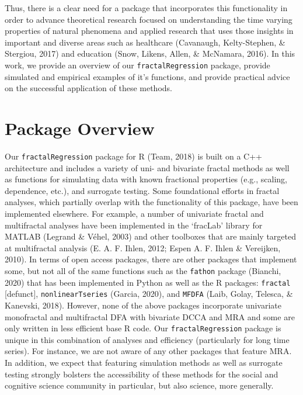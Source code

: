 \documentclass[
  man]{apa6}
\begin{document}
Thus, there is a clear need for a package that incorporates this
functionality in order to advance theoretical research focused on
understanding the time varying properties of natural phenomena and
applied research that uses those insights in important and diverse areas
such as healthcare (Cavanaugh, Kelty-Stephen, \& Stergiou, 2017) and education (Snow, Likens, Allen, \& McNamara, 2016). In this
work, we provide an overview of our \texttt{fractalRegression} package, provide
simulated and empirical examples of it's functions, and provide
practical advice on the successful application of these methods.

\hypertarget{package-overview}{%
\section{Package Overview}\label{package-overview}}

Our \texttt{fractalRegression} package for R
(Team, 2018) is built on a C++
architecture and includes a variety of uni- and bivariate fractal
methods as well as functions for simulating data with known fractional
properties (e.g., scaling, dependence, etc.), and surrogate testing.
Some foundational efforts in fractal analyses, which partially overlap
with the functionality of this package, have been implemented elsewhere.
For example, a number of univariate fractal and multifractal analyses
have been implemented in the `fracLab' library for MATLAB (Legrand \& Véhel, 2003)
and other toolboxes that are mainly targeted at multifractal analysis
(E. A. F. Ihlen, 2012; Espen A. F. Ihlen \& Vereijken, 2010). In terms of
open access packages, there are other packages that implement some, but
not all of the same functions such as the \texttt{fathon} package
(Bianchi, 2020) that has been implemented in Python as well as the R
packages: \texttt{fractal} {[}defunct{]}, \texttt{nonlinearTseries}
(Garcia, 2020), and \texttt{MFDFA}
(Laib, Golay, Telesca, \& Kanevski, 2018). However, none of the above packages
incorporate univariate monofractal and multifractal DFA with bivariate
DCCA and MRA and some are only written in less efficient base R code.
Our \texttt{fractalRegression} package is unique in this combination of
analyses and efficiency (particularly for long time series). For
instance, we are not aware of any other packages that feature MRA. In
addition, we expect that featuring simulation methods as well as
surrogate testing strongly bolsters the accessibility of these methods
for the social and cognitive science community in particular, but also
science, more generally.
\end{document}
